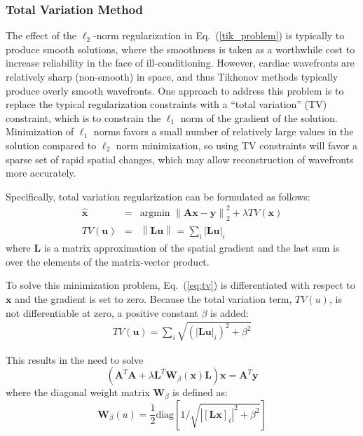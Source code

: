 \documentclass[fleqn,11pt,openany]{book}
\begin{document}
\subsubsection{Total Variation Method} \label{sec:inv-tv}

The effect of the $\ell_{2}$-norm regularization in Eq.~(\ref{tik_problem}) is
typically to produce smooth solutions, where the smoothness is taken as a
worthwhile cost to increase reliability in the face of
ill-conditioning. However, cardiac wavefronts are relatively sharp
(non-smooth) in space, and thus Tikhonov methods typically produce overly
smooth wavefronts. One approach to address this problem is to replace the
typical regularization constraints with a ``total variation'' (TV) constraint,
which is to constrain the $\ell_{1}$ norm of the gradient of the
solution. Minimization of $\ell_{1}$ norms favors a small number of
relatively large values in the solution compared to $\ell_{2}$ norm
minimization, so using TV constraints will favor a sparse set of
rapid spatial changes, which may allow reconstruction of wavefronts more
accurately.

Specifically, total variation regularization can be formulated as follows:
%
\begin{eqnarray}
     \mathbf{\hat{x}} &=& \mbox{argmin   } \left\|\mathbf{A}\mathbf{x} -
     \mathbf{y}\right\|^2_{2} + \lambda TV(\mathbf{x}) \label{eq:tv} \\
     TV(\mathbf{u}) &=&  \left\| \mathbf{L}\mathbf{u} \right\|_{} = \sum_i |\mathbf{L}\mathbf{u}|_i \label{eq:tv-term}
\end{eqnarray}
%
\noindent where $\mathbf{L}$ is a matrix approximation of the spatial gradient and
the last sum is over the elements of the matrix-vector product.


To solve this minimization problem, Eq.~(\ref{eq:tv}) is differentiated
with respect to $\mathbf{x}$ and the gradient is set to zero. Because the total variation term, $TV(u)$, is not differentiable at zero, a positive constant $\beta$ is added:
%
\begin{eqnarray} \label{eqn:tv-term2}
TV(\mathbf{u}) = \sum_i \sqrt{(|\mathbf{L}\mathbf{u}|_i)^2 + \beta^2}
\end{eqnarray}

This results in the need to solve
%
\begin{equation}\label{eq:tv3}
(\mathbf{A}^T\mathbf{A}+\lambda
\mathbf{L}^T\mathbf{W}_{\beta}(\mathbf{x})\mathbf{L}) \mathbf{x} =
\mathbf{A}^T\mathbf{y}
\end{equation}
%
\noindent where the diagonal weight matrix $\mathbf{W}_{\beta}$ is defined as:
%
\begin{equation} \label{eq:tv-weightmat}
\mathbf{W}_{\beta}(u) = \frac{1}{2} \mbox{diag} \left[ 1 / \sqrt{|[\mathbf{L}\mathbf{x}]_i|^2 + \beta^2}\right]
\end{equation}
\end{document}
